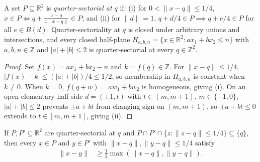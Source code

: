\begin{lemma}
    \label{thm:area_law_quarter_sections}
    \leanok
    A set $P\subseteq\mathbb R^2$ is \emph{quarter-sectorial at $q$} if:
    (i) for $0<\|x-q\|\le1/4$, $x\in P\iff q+\frac{x-q}{4\|x-q\|}\in P$; and
    (ii) for $\|d\|=1$, $q+d/4\in P\implies q+e/4\in P$ for all $e\in B(d)$.
    Quarter-sectoriality at $q$ is closed under arbitrary unions and intersections, and
    every closed half-plane $H_{a,b,n}=\{x\in\mathbb R^2:ax_1+bx_2\le n\}$ with
    $a,b,n\in\mathbb Z$ and $|a|+|b|\le2$ is quarter-sectorial at every $q\in\mathbb Z^2$.
\end{lemma}

\begin{proof}
    \leanok
    Set $f(x)=ax_1+bx_2-n$ and $k=f(q)\in\mathbb Z$. For $\|x-q\|\le1/4$,
    $|f(x)-k|\le(|a|+|b|)/4\le1/2$, so membership in $H_{a,b,n}$ is constant when $k\ne0$.
    When $k=0$, $f(q+w)=aw_1+bw_2$ is homogeneous, giving (i). On an open elementary half-side
    $d=(\pm1,t)$ with $t\in(m,m+1)$, $m\in\{-1,0\}$, $|a|+|b|\le2$ prevents $\pm a+bt$ from
    changing sign on $(m,m+1)$, so $\pm a+bt\le0$ extends to $t\in[m,m+1]$, giving (ii).
\end{proof}

\begin{lemma}
    \label{thm:area_law_contact_angular_estimate}
    \leanok
    If $P,P'\subseteq\mathbb R^2$ are quarter-sectorial at $q$ and
    $P\cap P'\cap\{z:\|z-q\|\le1/4\}\subseteq\{q\}$, then every $x\in P$ and $y\in P'$
    with $\|x-q\|,\|y-q\|\le1/4$ satisfy
    \begin{align}
        \|x-y\| & \ge\tfrac12\max(\|x-q\|,\|y-q\|).
        \label{eq:area_law_contact_angular_estimate}
    \end{align}
\end{lemma}

